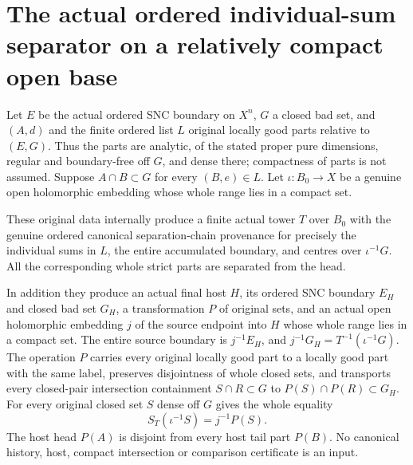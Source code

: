 \section{The actual ordered individual-sum separator on a relatively compact open base}
\label{sec:hironaka-original-local-canonical-part-list-resolution}

\begin{theorem}
\label{hir:original-local-canonical-ordered-separator-host}
Let $E$ be the actual ordered SNC boundary on $X^n$, $G$ a closed bad
set, and $(A,d)$ and the finite ordered list $L$ original locally good
parts relative to $(E,G)$. Thus the parts are analytic, of the stated
proper pure dimensions, regular and boundary-free off $G$, and dense
there; compactness of parts is not assumed. Suppose $A\cap B\subset G$
for every $(B,e)\in L$. Let $\iota:B_0\to X$ be a genuine open
holomorphic embedding whose whole range lies in a compact set.

These original data internally produce a finite actual tower $T$ over
$B_0$ with the genuine ordered canonical separation-chain provenance
for precisely the individual sums in $L$, the entire accumulated
boundary, and centres over $\iota^{-1}G$. All the corresponding whole
strict parts are separated from the head.

In addition they produce an actual final host $H$, its ordered SNC
boundary $E_H$ and closed bad set $G_H$, a transformation $P$ of
original sets, and an actual open holomorphic embedding $j$ of the
source endpoint into $H$ whose whole range lies in a compact set.
The entire source boundary is $j^{-1}E_H$, and
$j^{-1}G_H=T^{-1}(\iota^{-1}G)$. The operation $P$ carries every
original locally good part to a locally good part with the same
label, preserves disjointness of whole closed sets, and transports every
closed-pair intersection containment $S\cap R\subset G$ to
$P(S)\cap P(R)\subset G_H$. For every original
closed set $S$ dense off $G$ gives the whole equality
\[
 S_T(\iota^{-1}S)=j^{-1}P(S).
\]
The host head $P(A)$ is disjoint from every host tail part $P(B)$.
No canonical history, host, compact intersection or comparison
certificate is an input.
\leanok
\end{theorem}
